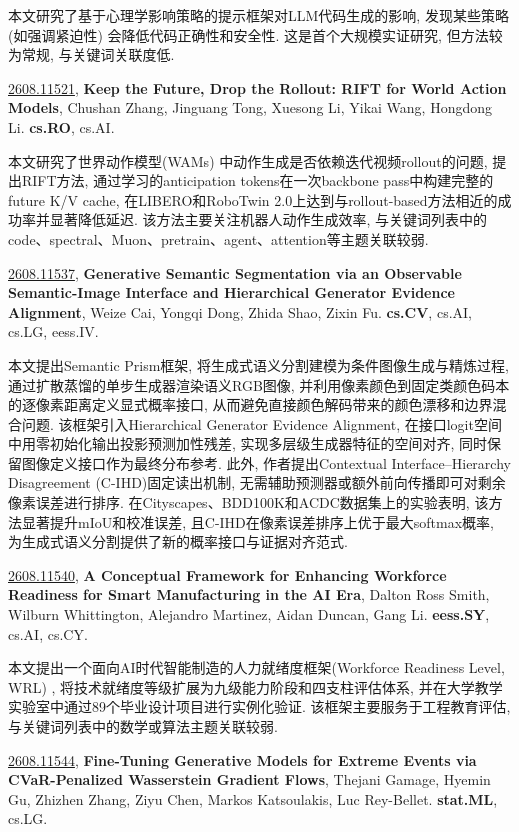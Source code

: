 \documentclass[9pt, a4paper]{article}
\theoremstyle{plain}
\theoremstyle{definition}
\theoremstyle{remark}
\newcommand{\arxivwithtarget}[3]{\hypertarget{#1}{}\href{https://arxiv.org/abs/#1}{#1}, \textbf{\textcolor{arxivblue}{#2}}, #3. }
\begin{document}
本文研究了基于心理学影响策略的提示框架对LLM代码生成的影响, 发现某些策略(如强调紧迫性) 会降低代码正确性和安全性. 这是首个大规模实证研究, 但方法较为常规, 与关键词关联度低.


\arxivwithtarget{2608.11521}{Keep the Future, Drop the Rollout: RIFT for World Action Models}{Chushan Zhang, Jinguang Tong, Xuesong Li, Yikai Wang, Hongdong Li}\textbf{cs.RO}, cs.AI.

本文研究了世界动作模型(WAMs) 中动作生成是否依赖迭代视频rollout的问题, 提出RIFT方法, 通过学习的anticipation tokens在一次backbone pass中构建完整的future K/V cache, 在LIBERO和RoboTwin 2.0上达到与rollout-based方法相近的成功率并显著降低延迟. 该方法主要关注机器人动作生成效率, 与关键词列表中的code、spectral、Muon、pretrain、agent、attention等主题关联较弱.


\arxivwithtarget{2608.11537}{Generative Semantic Segmentation via an Observable Semantic-Image Interface and Hierarchical Generator Evidence Alignment}{Weize Cai, Yongqi Dong, Zhida Shao, Zixin Fu}\textbf{cs.CV}, cs.AI, cs.LG, eess.IV.

本文提出Semantic Prism框架, 将生成式语义分割建模为条件图像生成与精炼过程, 通过扩散蒸馏的单步生成器渲染语义RGB图像, 并利用像素颜色到固定类颜色码本的逐像素距离定义显式概率接口, 从而避免直接颜色解码带来的颜色漂移和边界混合问题. 该框架引入Hierarchical Generator Evidence Alignment, 在接口logit空间中用零初始化输出投影预测加性残差, 实现多层级生成器特征的空间对齐, 同时保留图像定义接口作为最终分布参考. 此外, 作者提出Contextual Interface--Hierarchy Disagreement (C-IHD)固定读出机制, 无需辅助预测器或额外前向传播即可对剩余像素误差进行排序. 在Cityscapes、BDD100K和ACDC数据集上的实验表明, 该方法显著提升mIoU和校准误差, 且C-IHD在像素误差排序上优于最大softmax概率, 为生成式语义分割提供了新的概率接口与证据对齐范式.


\arxivwithtarget{2608.11540}{A Conceptual Framework for Enhancing Workforce Readiness for Smart Manufacturing in the AI Era}{Dalton Ross Smith, Wilburn Whittington, Alejandro Martinez, Aidan Duncan, Gang Li}\textbf{eess.SY}, cs.AI, cs.CY.

本文提出一个面向AI时代智能制造的人力就绪度框架(Workforce Readiness Level, WRL) , 将技术就绪度等级扩展为九级能力阶段和四支柱评估体系, 并在大学教学实验室中通过89个毕业设计项目进行实例化验证. 该框架主要服务于工程教育评估, 与关键词列表中的数学或算法主题关联较弱.


\arxivwithtarget{2608.11544}{Fine-Tuning Generative Models for Extreme Events via CVaR-Penalized Wasserstein Gradient Flows}{Thejani Gamage, Hyemin Gu, Zhizhen Zhang, Ziyu Chen, Markos Katsoulakis, Luc Rey-Bellet}\textbf{stat.ML}, cs.LG.
\end{document}

